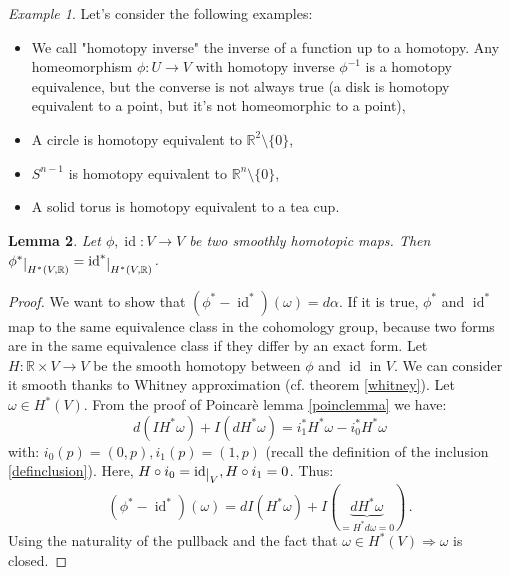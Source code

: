 \documentclass[a4paper,11pt,titlepage, article, oneside]{memoir}
\numberwithin{equation}{section}
\newtheorem{theorem}{Theorem}[section]
\newtheorem{lemma}[theorem]{Lemma}
\theoremstyle{definition}
\theoremstyle{remark}
\newtheorem{example}[theorem]{Example}
\DeclareMathOperator{\id}{id}
\newcommand{\rfield}{\mathbb{R}}
\newcommand{\restrict}[2]{{#1}\raisebox{-.5ex}{$|$}_{#2}}
\begin{document}
 \begin{tcolorbox}\begin{example}
   Let's consider the following examples:
   \begin{itemize}
     \item We call "homotopy inverse" the inverse of a function up to a homotopy. Any homeomorphism $\phi \colon U \rightarrow V$ with homotopy inverse $\phi^{-1}$ is a homotopy equivalence, but the converse is not always true (a disk is homotopy equivalent to a point, but it's not homeomorphic to a point),
     \item A circle is homotopy equivalent to $\rfield^2 \setminus \{0\}$,
     \item $S^{n-1}$ is homotopy equivalent to $\rfield^n \setminus \{0\}$,
     \item A solid torus is homotopy equivalent to a tea cup.
   \end{itemize}
 \end{example}\end{tcolorbox}

 \begin{lemma} \label{homlemma}
   Let $\phi, \id \colon V \rightarrow V$ be two smoothly homotopic maps. Then $\restrict{\phi^*}{H^*(V, \rfield)} = \restrict{\id^*}{H^*(V, \rfield)}$.
 \end{lemma}
 \begin{proof}
 We want to show that $(\phi^* - \id^*)(\omega) = d \alpha$. If it is true, $\phi^*$ and $\id^*$ map to the same equivalence class in the cohomology group, because two forms are in the same equivalence class if they differ by an exact form. Let $H \colon \rfield \times V \rightarrow V$ be the smooth homotopy between $\phi$ and $\id$ in $V$. We can consider it smooth thanks to Whitney approximation (cf. theorem \ref{whitney}). Let $\omega \in H^*(V)$. From the proof of Poincarè lemma \ref{poinclemma} we have:
 $$d(I H^* \omega) + I(d H^* \omega) = i_1^* H^* \omega - i_0^* H^* \omega$$
 with: $i_0(p) = (0, p), i_1(p) = (1, p)$ (recall the definition of the inclusion \eqref{definclusion}).
 Here, $H \circ i_0 = \restrict{\id}{V}, H \circ i_1= 0$. Thus: 
 $$(\phi^* - \id^*)(\omega) = dI (H^* \omega) + I(\underbrace{d H^* \omega}_{=H^*d \omega = 0})\, .$$
 Using the naturality of the pullback and the fact that $\omega \in H^*(V) \Rightarrow \omega$ is closed. 
 \end{proof}

\end{document}
